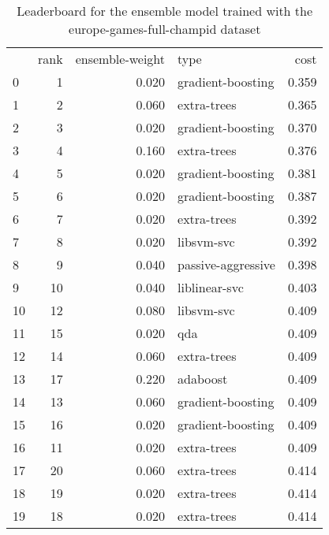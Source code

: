 \begin{table}[]
	\centering
	\begin{tabular}{lrrlr}
		   & rank & ensemble-weight & type               & cost  \\
		0  & 1    & 0.020           & gradient-boosting  & 0.359 \\
		1  & 2    & 0.060           & extra-trees        & 0.365 \\
		2  & 3    & 0.020           & gradient-boosting  & 0.370 \\
		3  & 4    & 0.160           & extra-trees        & 0.376 \\
		4  & 5    & 0.020           & gradient-boosting  & 0.381 \\
		5  & 6    & 0.020           & gradient-boosting  & 0.387 \\
		6  & 7    & 0.020           & extra-trees        & 0.392 \\
		7  & 8    & 0.020           & libsvm-svc         & 0.392 \\
		8  & 9    & 0.040           & passive-aggressive & 0.398 \\
		9  & 10   & 0.040           & liblinear-svc      & 0.403 \\
		10 & 12   & 0.080           & libsvm-svc         & 0.409 \\
		11 & 15   & 0.020           & qda                & 0.409 \\
		12 & 14   & 0.060           & extra-trees        & 0.409 \\
		13 & 17   & 0.220           & adaboost           & 0.409 \\
		14 & 13   & 0.060           & gradient-boosting  & 0.409 \\
		15 & 16   & 0.020           & gradient-boosting  & 0.409 \\
		16 & 11   & 0.020           & extra-trees        & 0.409 \\
		17 & 20   & 0.060           & extra-trees        & 0.414 \\
		18 & 19   & 0.020           & extra-trees        & 0.414 \\
		19 & 18   & 0.020           & extra-trees        & 0.414 \\
	\end{tabular}

	\caption{Leaderboard for the ensemble model trained with the europe-games-full-champid dataset}
	\label{tab:lb-europe-games-full-champid-randsplit}
\end{table}

